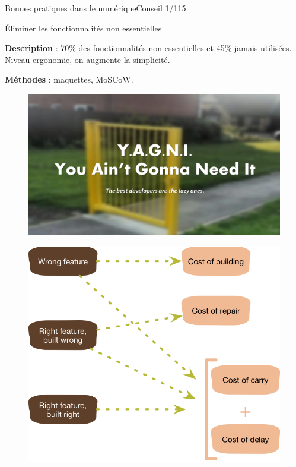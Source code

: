 
\begin{frame}{Bonnes pratiques dans le numérique}{Conseil 1/115}

\begin{block}{Éliminer les fonctionnalités non essentielles}

\textbf{Description} : 70\% des fonctionnalités non essentielles et 45\% jamais utilisées.
Niveau ergonomie, on augmente la simplicité.

\textbf{Méthodes} : maquettes, MoSCoW.


\begin{minipage}[b]{0.5\linewidth}  
\begin{figure}
    \includegraphics[scale=0.12]{chapitre2/wdd1/fig/yagni.png}
    \centering
\end{figure}
\end{minipage}\hfill
\begin{minipage}[b]{0.5\linewidth}  
\begin{figure}
    \centering
    \includegraphics[scale=0.22]{chapitre2/wdd1/fig/sketch.png}
\end{figure}
\end{minipage}\hfill

\end{block}
\end{frame}

